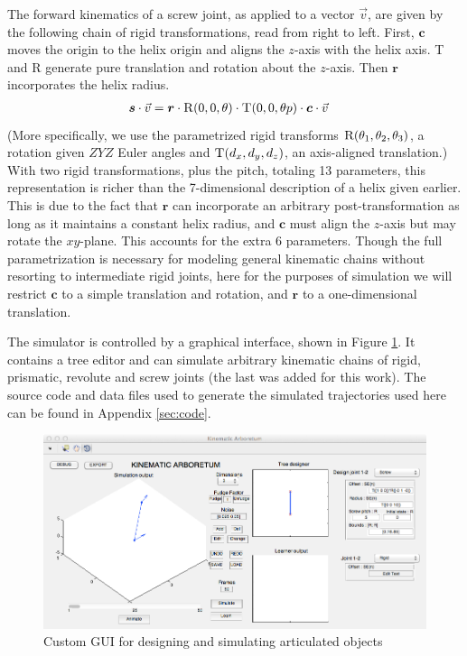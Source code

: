\documentclass[letterpaper, 10 pt, conference]{ieeeconf}  %
\def\xvec{\vec}          \def\xvecstr{with an arrow}
\def\xse{\bm}            \def\xsestr{in boldface}
\begin{document}
The forward kinematics of a screw joint, as applied to a vector $\xvec{v}$, are given by the following chain of rigid transformations, read from right to left. First, $\xse{c}$ moves the origin to the helix origin and aligns the $z$-axis with the helix axis. \textsc{T} and \textsc{R} generate pure translation and rotation about the $z$-axis. Then $\xse{r}$ incorporates the helix radius.
\begin{align}
  \xse{s} \cdot \xvec{v} &= \xse{r} \cdot \textsc{R}(0, 0, \theta) \cdot \textsc{T}(0, 0, \theta p) \cdot \xse{c} \cdot \xvec{v}
\end{align}
(More specifically, we use the parametrized rigid transforms $\textsc{R}(\theta_1, \theta_2, \theta_3)$, a rotation given $ZYZ$ Euler angles and $\textsc{T}(d_x, d_y, d_z)$, an axis-aligned translation.) With two rigid transformations, plus the pitch, totaling 13 parameters, this representation is richer than the 7-dimensional description of a helix given earlier. This is due to the fact that $\xse{r}$ can incorporate an arbitrary post-transformation as long as it maintains a constant helix radius, and $\xse{c}$ must align the $z$-axis but may rotate the $xy$-plane. This accounts for the extra 6 parameters. Though the full parametrization is necessary for modeling general kinematic chains without resorting to intermediate rigid joints, here for the purposes of simulation we will restrict $\xse{c}$ to a simple translation and rotation, and $\xse{r}$ to a one-dimensional translation.

The simulator is controlled by a graphical interface, shown in Figure \ref{fig:gui}. It contains a tree editor and can simulate arbitrary kinematic chains of rigid, prismatic, revolute and screw joints (the last was added for this work). The source code and data files used to generate the simulated trajectories used here can be found in Appendix \ref{sec:code}.

\begin{figure}[ht]
  \centering
  \includegraphics[width=.47\textwidth]{img/screenshot.png}
  \caption{Custom GUI for designing and simulating articulated objects}
  \label{fig:gui}
\end{figure}
\end{document}
